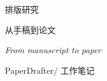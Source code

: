 \documentclass[11pt,a4paper]{article}
\begin{document}

\vspace*{8mm}
{\small\sffamily\color{accent} 排版研究\par}
\vspace{3mm}
{\Huge 从手稿到论文\par}
\vspace{2mm}
{\large\itshape From manuscript to paper\par}
\vspace{6mm}
{\small PaperDrafter\quad / \quad 工作笔记}\par



\end{document}
